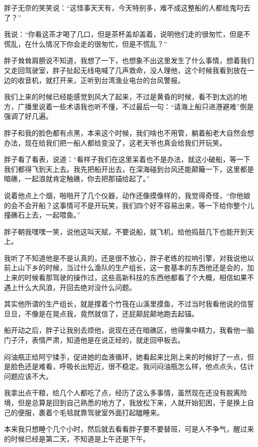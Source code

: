 胖子无奈的笑笑说：“这怪事天天有，今天特别多，难不成这整船的人都给鬼叼去了？”

我说：“你看这茶才喝了几口，但是茶杯盖却盖着，说明他们走的很匆忙，但是不慌乱，在什么情况下你会走的很匆忙，但是不慌乱？”

胖子耸耸肩膀说不知道，我想了一下，也想象不出这里发生了什么事情，想着我们又走回驾驶室，胖子扯起无线电喊了几声救命，没人理他，这个时候我看到放在一边的收音机，就打开来，正听到台湾渔业电台的台风警报。

我们上来的时候已经能感觉到风大了起来，不过是黄昏的时候，看不到太远的地方，广播里说着一些术语我也听不懂，不过最后一句：“请海上船只进港避难”倒是强调了好几遍。

胖子和我的脸色都有点黑，本来这个时候，我们啥也不用管，躺着船老大自然会想办法，现在给我们把一船人都给变没了，这老天爷也真会给我们开玩笑。

胖子看了看表，说道：“看样子我们在这里呆着也不是办法，就这小破船，等一下我们都得飞到天上去。我先把船开出去，在深海碰到台风还能颠簸一下，这里都是暗礁，一起浪就肯定触礁，你去把那锚给起了。”

说着他点上个烟，啪啪开了几个仪器，动作还像摸像样的，我觉得奇怪，“你他娘的会不会开船？这事情可不是开玩笑，我们四个好不容易出来，等一下给你整个儿撞礁石上去，一起喂鱼。”

胖子朝我嘿嘿一笑，说他这叫天赋，不要说船，就飞机，给他捣鼓几下也能开到天上。

我听了不知道他是不是认真的，还是很不放心，胖子老练的拉响引擎，对我说他以前上山下乡的时候，当过什么渔队的生产组长，这一套基本的东西他还是会的，加上来的时候看那驾驶的操作过，这些高新科技的东西他都看了个大概，相信如果不遇上什么大风浪，开回去绝对没什么问题。

其实他所谓的生产组长，就是撑着个竹筏在山溪里摸鱼，不过当时我看他说的信誓旦旦，不像是在晃点我，竟然就信了，还屁颠屁颠地跑去起锚。

船开动之后，胖子让我别去烦他，说现在还在暗礁区，他得集中精力，我看他一脑门子汗，表情严肃，知道他是在说正经的，就走回甲板去。

闷油瓶正给阿宁揉手，促进她的血液循环，她看起来比刚上来的时候好了一点，但是脸色还是难看，呼吸长出短近，很不稳定。我问闷油瓶怎么样，他点点头，估计问题应该不大。

我拿出点干粮，给几个人都吃了点，经历了这么多事情，虽然现在还没有脱离险境，但是总算是回到自己熟悉的地方了，我放松下来，人就开始犯困，于是换上自己的便服，裹着个毛毯就靠驾驶室外面打起瞌睡来。

本来我只想睡个几个小时，然后就去看看胖子要不要替班，可是人不争气，醒过来的时候已经是第二天，不知道是上午还是下午。

